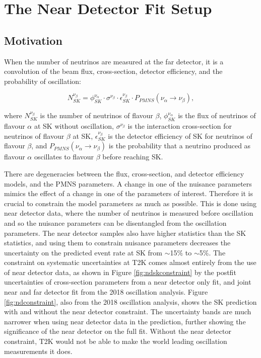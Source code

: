 \newpage
\newpage
\chapter{The Near Detector Fit Setup}\label{sec:FitSetup}
\section{Motivation}

When the number of neutrinos are measured at the far detector, it is a convolution of the beam flux, cross-section, detector efficiency, and the probability of oscillation:

\begin{equation}
N^{\nu_{\beta}}_{SK} = \phi^{\nu_\alpha}_{SK} \cdot \sigma^{\nu_{\beta}} \cdot \epsilon^{\nu_{\beta}}_{SK} \cdot P_{PMNS}(\nu_{\alpha}\rightarrow\nu_{\beta}),
\end{equation}

where $N^{\nu_\beta}_{SK}$ is the number of neutrinos of flavour $\beta$, $\phi^{\nu_\alpha}_{SK}$ is the flux of neutrinos of flavour $\alpha$ at SK without oscillation, $\sigma^{\nu_{\beta}}$ is the interaction cross-section for neutrinos of flavour $\beta$ at SK, $\epsilon^{\nu_\beta}_{SK} $ is the detector efficiency of SK for neutrinos of flavour $\beta$, and $P_{PMNS}(\nu_{\alpha}\rightarrow\nu_{\beta})$ is the probability that a neutrino produced as flavour $\alpha$ oscillates to flavour $\beta$ before reaching SK.

There are degeneracies between the flux, cross-section, and detector efficiency models, and the PMNS parameters. A change in one of the nuisance parameters mimics the effect of a change in one of the parameters of interest. Therefore it is crucial to constrain the model parameters as much as possible. This is done using near detector data, where the number of neutrinos is measured before oscillation and so the  nuisance parameters can be disentangled from the oscillation parameters. The near detector samples also have higher statistics than the SK statistics, and using them to constrain nuisance parameters decreases the uncertainty on the predicted event rate at SK from $\sim$15$\%$ to $\sim$5$\%$. The constraint on systematic uncertainties at T2K comes almost entirely from the use of near detector data, as shown in Figure \ref{fig:ndskconstraint} by the postfit uncertainties of cross-section parameters from a near detector only fit, and joint near and far detector fit from the 2018 oscillation analysis. Figure \ref{fig:ndconstraint}, also from the 2018 oscillation analysis, shows the SK prediction with and without the near detector constraint. The uncertainty bands are much narrower when using near detector data in the prediction, further showing the significance of the near detector on the full fit. Without the near detector constraint, T2K would not be able to make the world leading oscillation measurements it does.

